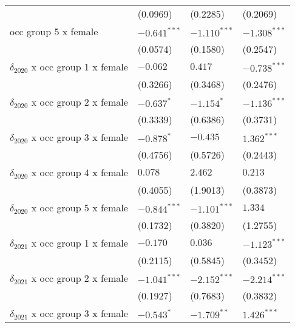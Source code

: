 \begin{tabular}{llll}
                                       &           (0.0969) &           (0.2285) &           (0.2069) \\
occ group 5 x female                   &     $-0.641^{***}$ &     $-1.110^{***}$ &     $-1.308^{***}$ \\
                                       &           (0.0574) &           (0.1580) &           (0.2547) \\
$\delta_{2020}$ x occ group 1 x female &           $-0.062$ &            $0.417$ &     $-0.738^{***}$ \\
                                       &           (0.3266) &           (0.3468) &           (0.2476) \\
$\delta_{2020}$ x occ group 2 x female &         $-0.637^*$ &         $-1.154^*$ &     $-1.136^{***}$ \\
                                       &           (0.3339) &           (0.6386) &           (0.3731) \\
$\delta_{2020}$ x occ group 3 x female &         $-0.878^*$ &           $-0.435$ &      $1.362^{***}$ \\
                                       &           (0.4756) &           (0.5726) &           (0.2443) \\
$\delta_{2020}$ x occ group 4 x female &            $0.078$ &            $2.462$ &            $0.213$ \\
                                       &           (0.4055) &           (1.9013) &           (0.3873) \\
$\delta_{2020}$ x occ group 5 x female &     $-0.844^{***}$ &     $-1.101^{***}$ &            $1.334$ \\
                                       &           (0.1732) &           (0.3820) &           (1.2755) \\
$\delta_{2021}$ x occ group 1 x female &           $-0.170$ &            $0.036$ &     $-1.123^{***}$ \\
                                       &           (0.2115) &           (0.5845) &           (0.3452) \\
$\delta_{2021}$ x occ group 2 x female &     $-1.041^{***}$ &     $-2.152^{***}$ &     $-2.214^{***}$ \\
                                       &           (0.1927) &           (0.7683) &           (0.3832) \\
$\delta_{2021}$ x occ group 3 x female &         $-0.543^*$ &      $-1.709^{**}$ &      $1.426^{***}$ \\

\end{tabular}
